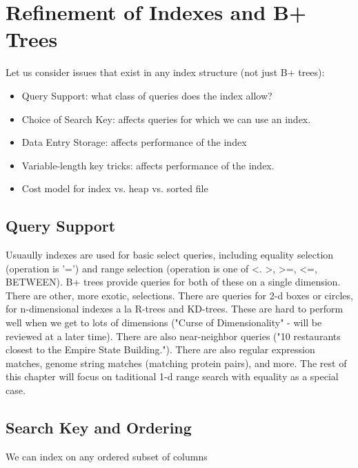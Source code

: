 \documentclass[10pt,a4paper]{book}
\begin{document}
\chapter{Refinement of Indexes and B+ Trees}
Let us consider issues that exist in any index structure (not just B+ trees):
\begin{itemize}
  \item Query Support: what class of queries does the index allow?
  \item Choice of Search Key: affects queries for which we can use an index.
  \item Data Entry Storage: affects performance of the index
  \item Variable-length key tricks: affects performance of the index.
  \item Cost model for index vs. heap vs. sorted file
\end{itemize}
\section{Query Support}
Usuaully indexes are used for basic select queries, including equality selection (operation is '=') and range selection (operation is one of <. >, >=, <=, BETWEEN). B+ trees provide queries for both of these on a single dimension.
There are other, more exotic, selections. There are queries for 2-d boxes or circles, for n-dimensional indexes a la R-trees and KD-trees. These are hard to perform well when we get to lots of dimensions ("Curse of Dimensionality" - will be reviewed at a later time). There are also near-neighbor queries ("10 restaurants closest to the Empire State Building."). There are also regular expression matches, genome string matches (matching protein pairs), and more. The rest of this chapter will focus on taditional 1-d range search with equality as a special case.
\section{Search Key and Ordering}
We can index on any ordered subset of columns
\end{document}
